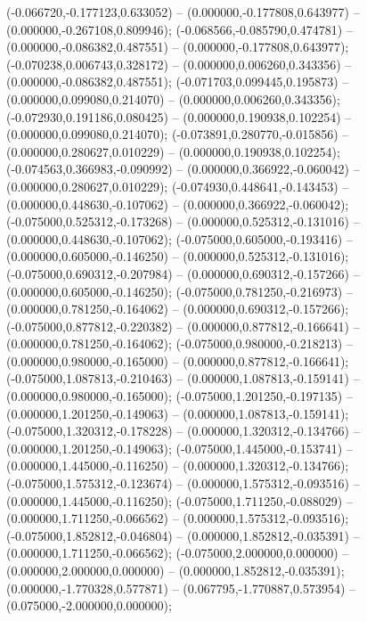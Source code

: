  (-0.066720,-0.177123,0.633052) -- (0.000000,-0.177808,0.643977) -- (0.000000,-0.267108,0.809946);
 (-0.068566,-0.085790,0.474781) -- (0.000000,-0.086382,0.487551) -- (0.000000,-0.177808,0.643977);
 (-0.070238,0.006743,0.328172) -- (0.000000,0.006260,0.343356) -- (0.000000,-0.086382,0.487551);
 (-0.071703,0.099445,0.195873) -- (0.000000,0.099080,0.214070) -- (0.000000,0.006260,0.343356);
 (-0.072930,0.191186,0.080425) -- (0.000000,0.190938,0.102254) -- (0.000000,0.099080,0.214070);
 (-0.073891,0.280770,-0.015856) -- (0.000000,0.280627,0.010229) -- (0.000000,0.190938,0.102254);
 (-0.074563,0.366983,-0.090992) -- (0.000000,0.366922,-0.060042) -- (0.000000,0.280627,0.010229);
 (-0.074930,0.448641,-0.143453) -- (0.000000,0.448630,-0.107062) -- (0.000000,0.366922,-0.060042);
 (-0.075000,0.525312,-0.173268) -- (0.000000,0.525312,-0.131016) -- (0.000000,0.448630,-0.107062);
 (-0.075000,0.605000,-0.193416) -- (0.000000,0.605000,-0.146250) -- (0.000000,0.525312,-0.131016);
 (-0.075000,0.690312,-0.207984) -- (0.000000,0.690312,-0.157266) -- (0.000000,0.605000,-0.146250);
 (-0.075000,0.781250,-0.216973) -- (0.000000,0.781250,-0.164062) -- (0.000000,0.690312,-0.157266);
 (-0.075000,0.877812,-0.220382) -- (0.000000,0.877812,-0.166641) -- (0.000000,0.781250,-0.164062);
 (-0.075000,0.980000,-0.218213) -- (0.000000,0.980000,-0.165000) -- (0.000000,0.877812,-0.166641);
 (-0.075000,1.087813,-0.210463) -- (0.000000,1.087813,-0.159141) -- (0.000000,0.980000,-0.165000);
 (-0.075000,1.201250,-0.197135) -- (0.000000,1.201250,-0.149063) -- (0.000000,1.087813,-0.159141);
 (-0.075000,1.320312,-0.178228) -- (0.000000,1.320312,-0.134766) -- (0.000000,1.201250,-0.149063);
 (-0.075000,1.445000,-0.153741) -- (0.000000,1.445000,-0.116250) -- (0.000000,1.320312,-0.134766);
 (-0.075000,1.575312,-0.123674) -- (0.000000,1.575312,-0.093516) -- (0.000000,1.445000,-0.116250);
 (-0.075000,1.711250,-0.088029) -- (0.000000,1.711250,-0.066562) -- (0.000000,1.575312,-0.093516);
 (-0.075000,1.852812,-0.046804) -- (0.000000,1.852812,-0.035391) -- (0.000000,1.711250,-0.066562);
 (-0.075000,2.000000,0.000000) -- (0.000000,2.000000,0.000000) -- (0.000000,1.852812,-0.035391);
 (0.000000,-1.770328,0.577871) -- (0.067795,-1.770887,0.573954) -- (0.075000,-2.000000,0.000000);
